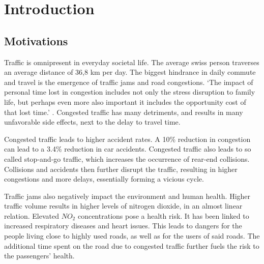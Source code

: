 \section{Introduction}
\subsection{Motivations}
Traffic is omnipresent in everyday societal life. The average swiss person traverses an average distance of 36,8 km per day.  \cite{mobil}
The biggest hindrance in daily commute and travel is the emergence of traffic jams and road congestions. `The impact of personal time lost in congestion includes not only the stress disruption to family life, but perhaps even more also important it includes the opportunity cost of that lost time.' \cite{congestion}. Congested traffic has many detriments, and results in many unfavorable side effects, next to the delay to travel time. 

Congested traffic leads to higher accident rates. A 10\% reduction in congestion can lead to a 3.4\% reduction in car accidents. \cite{SanchGoz}  Congested traffic also leads to so called stop-and-go traffic, which increases the occurrence of rear-end collisions. \cite{golob} Collisions and accidents then further disrupt the traffic, resulting in higher congestions and more delays, essentially forming a vicious cycle.

Traffic jams also negatively impact the environment and human health. Higher traffic volume results in higher levels of nitrogen dioxide, in an almost linear relation. \cite{zhang} Elevated $NO_2$ concentrations pose a health risk. It has been linked to increased respiratory diseases and heart issues. \cite{goudarzia} This leads to dangers for the people living close to highly used roads, as well as for the users of said roads. The additional time spent on the road due to congested traffic further fuels the risk to the passengers' health.

